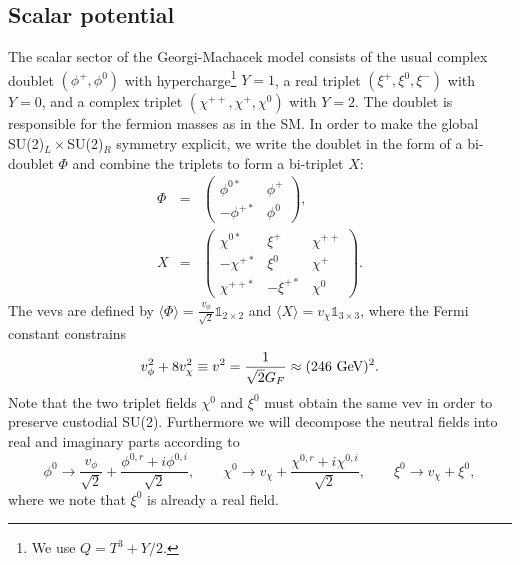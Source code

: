 \documentclass[11pt]{article}
\begin{document}
\subsection{Scalar potential}

The scalar sector of the Georgi-Machacek model consists of the usual complex doublet $(\phi^+,\phi^0)$ with hypercharge\footnote{We use $Q = T^3 + Y/2$.} $Y = 1$, a real 
triplet $(\xi^+,\xi^0,\xi^-)$ with $Y = 0$, and  a complex triplet $(\chi^{++},\chi^+,\chi^0)$ with $Y=2$.  The doublet is responsible for the fermion masses as in the SM.
In order to make the global SU(2)$_L \times$SU(2)$_R$ symmetry explicit, we write the doublet in the form of a bi-doublet $\Phi$ and combine the triplets to form a bi-triplet $X$:
\begin{eqnarray}
	\Phi &=& \left( \begin{array}{cc}
	\phi^{0*} &\phi^+  \\
	-\phi^{+*} & \phi^0  \end{array} \right), \\
	X &=&
	\left(
	\begin{array}{ccc}
	\chi^{0*} & \xi^+ & \chi^{++} \\
	 -\chi^{+*} & \xi^{0} & \chi^+ \\
	 \chi^{++*} & -\xi^{+*} & \chi^0  
	\end{array}
	\right).
	\label{eq:PX}
\end{eqnarray}
The vevs are defined by $\langle \Phi  \rangle = \frac{ v_{\phi}}{\sqrt{2}} \mathbb{1}_{2\times2}$  and $\langle X \rangle = v_{\chi} \mathbb{1}_{3 \times 3}$, where the Fermi constant constrains
\begin{equation}
	v_{\phi}^2 + 8 v_{\chi}^2 \equiv v^2 = \frac{1}{\sqrt{2} G_F} \approx (246~{\rm GeV})^2.
	\label{eq:vevrelation}
\end{equation} 
Note that the two triplet fields $\chi^0$ and $\xi^0$ must obtain the same vev in order to preserve custodial SU(2).
Furthermore we will decompose the neutral fields into real and imaginary parts according to
\begin{equation}
	\phi^0 \to \frac{v_{\phi}}{\sqrt{2}} + \frac{\phi^{0,r} + i \phi^{0,i}}{\sqrt{2}},
	\qquad
	\chi^0 \to v_{\chi} + \frac{\chi^{0,r} + i \chi^{0,i}}{\sqrt{2}}, 
	\qquad
	\xi^0 \to v_{\chi} + \xi^0,
\end{equation}
where we note that $\xi^0$ is already a real field.
\end{document}
